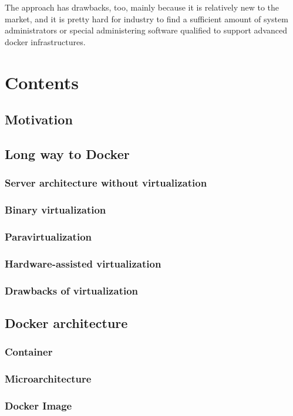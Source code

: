 The approach has drawbacks, too, mainly
because it is relatively new to the market,
and it is pretty hard for industry to find
a sufficient amount of system administrators or special
administering software qualified to support advanced docker infrastructures.

\appendix
\section{Contents}
\subsection{Motivation}
\subsection{Long way to Docker}
\subsubsection{Server architecture without virtualization}
\subsubsection{Binary virtualization}
\subsubsection{Paravirtualization}
\subsubsection{Hardware-assisted virtualization}
\subsubsection{Drawbacks of virtualization}
\subsection{Docker architecture}
\subsubsection{Container}
\subsubsection{Microarchitecture}
\subsubsection{Docker Image}
